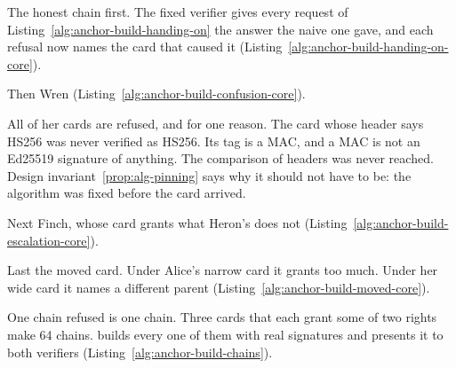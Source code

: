 The honest chain first. The fixed verifier gives every request of
Listing~\ref{alg:anchor-build-handing-on} the answer the naive one gave,
and each refusal now names the card that caused it
(Listing~\ref{alg:anchor-build-handing-on-core}).


Then Wren (Listing~\ref{alg:anchor-build-confusion-core}).


All of her cards are refused, and for one reason. The card whose header
says HS256 was never verified as HS256. Its tag is a MAC, and a MAC is not an
Ed25519 signature of anything. The comparison of headers was never reached.
Design invariant~\ref{prop:alg-pinning} says why it should not have to be:
the algorithm was fixed before the card arrived.

Next Finch, whose card grants what Heron's does not
(Listing~\ref{alg:anchor-build-escalation-core}).


Last the moved card. Under Alice's narrow card it grants too much. Under her
wide card it names a different parent
(Listing~\ref{alg:anchor-build-moved-core}).


One chain refused is one chain. Three cards that each grant some of two
rights make 64 chains. \pdkernelname{} builds every one of them with real
signatures and presents it to both verifiers
(Listing~\ref{alg:anchor-build-chains}).


